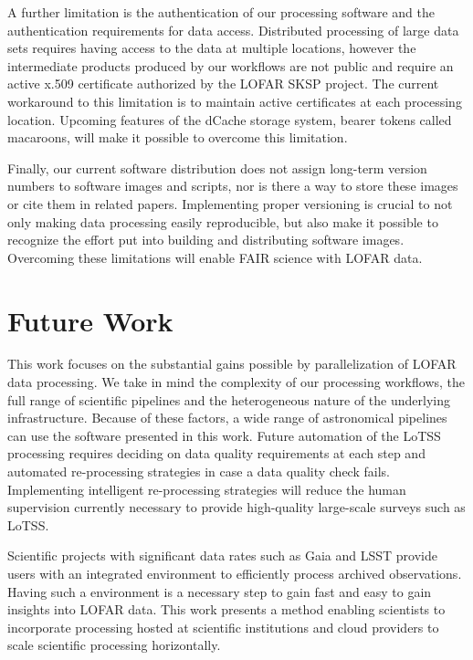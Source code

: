 A further limitation is the authentication of our processing software and the authentication requirements for data access. Distributed processing of large data sets requires having access to the data at multiple locations, however the intermediate products produced by our workflows are not public and require an active x.509 certificate authorized by the LOFAR SKSP project. The current workaround to this limitation is to maintain active certificates at each processing location. Upcoming features of the \gls{dCache} storage system, bearer tokens called macaroons, will make it possible to overcome this limitation.

Finally, our current software distribution does not assign long-term version numbers to software images and scripts, nor is there a way to store these images or cite them in related papers. Implementing proper versioning is crucial to not only making data processing easily reproducible, but also make it possible to recognize the effort put into building and distributing software images. Overcoming these limitations will enable FAIR science with LOFAR data\citep{wilkinson2016fair}.


\section{Future Work}

This work focuses on the substantial gains possible by parallelization of LOFAR data processing. We take in mind the complexity of our processing workflows, the full range of scientific pipelines and the heterogeneous nature of the underlying infrastructure. Because of these factors, a wide range of astronomical pipelines can use the software presented in this work. Future automation of the LoTSS processing requires deciding on data quality requirements at each step and automated re-processing strategies in case a data quality check fails. Implementing intelligent re-processing strategies will reduce the human supervision currently necessary to provide high-quality large-scale surveys such as LoTSS. 

Scientific projects with significant data rates such as Gaia and LSST provide users with an integrated environment to efficiently process archived observations. Having such a environment is a necessary step to gain fast and easy to gain insights into LOFAR data. This work presents a method enabling scientists to incorporate processing hosted at scientific institutions and cloud providers to scale scientific processing horizontally. 

